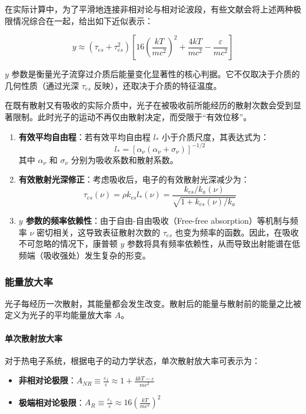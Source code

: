 在实际计算中，为了平滑地连接非相对论与相对论波段，有些文献会将上述两种极限情况综合在一起，给出如下近似表示：
\begin{tcolorbox}[colframe=black, colback=white, boxrule=0.5pt, arc=0pt]
\begin{equation}
    y \approx (\tau_{es} + \tau_{es}^2) \left[ 16 \left( \frac{kT}{mc^2} \right)^2 + \frac{4kT}{mc^2} - \frac{\varepsilon}{mc^2} \right]
\end{equation}
\end{tcolorbox}
$y$ 参数是衡量光子流穿过介质后能量变化显著性的核心判据。它不仅取决于介质的几何性质（通过光深 $\tau_{es}$ 反映），还取决于介质的特征温度。
\begin{derivationnote}[有吸收介质对散射次数的影响]
在既有散射又有吸收的实际介质中，光子在被吸收前所能经历的散射次数会受到显著限制。此时光子的运动不再仅由散射决定，而受限于“有效位移”。
\begin{enumerate}
    \item \textbf{有效平均自由程}：若有效平均自由程 $l_*$ 小于介质尺度，其表达式为：
    \begin{equation}
        l_* = [\alpha_\nu (\alpha_\nu + \sigma_\nu)]^{-1/2}
    \end{equation}
    其中 $\alpha_\nu$ 和 $\sigma_\nu$ 分别为吸收系数和散射系数。
    \item \textbf{有效散射光深修正}：考虑吸收后，电子的有效散射光深减少为：
    \begin{equation}
        \tau_{es}(\nu) = \rho k_{es} l_*(\nu) = \frac{k_{es} / k_a(\nu)}{\sqrt{1 + k_{es}(\nu) / k_a}}
    \end{equation}
    \item \textbf{$y$ 参数的频率依赖性}：由于自由-自由吸收（Free-free absorption）等机制与频率 $\nu$ 密切相关，这导致表征散射次数的 $\tau_{es}$ 也变为频率的函数。因此，在吸收不可忽略的情况下，康普顿 $y$ 参数将具有频率依赖性，从而导致出射能谱在低频端（吸收强处）发生复杂的形变。
\end{enumerate}
\end{derivationnote}

\subsubsection{能量放大率}

光子每经历一次散射，其能量都会发生改变。散射后的能量与散射前的能量之比被定义为光子的平均能量放大率 $A$。

\paragraph{单次散射放大率}
对于热电子系统，根据电子的动力学状态，单次散射放大率可表示为：
\begin{itemize}
    \item \textbf{非相对论极限}：$A_{NR} \equiv \frac{\varepsilon_1}{\varepsilon} \approx 1 + \frac{4kT - \varepsilon}{mc^2}$
    \item \textbf{极端相对论极限}：$A_{R} \equiv \frac{\varepsilon_1}{\varepsilon} \approx 16 \left( \frac{kT}{mc^2} \right)^2$
\end{itemize}

